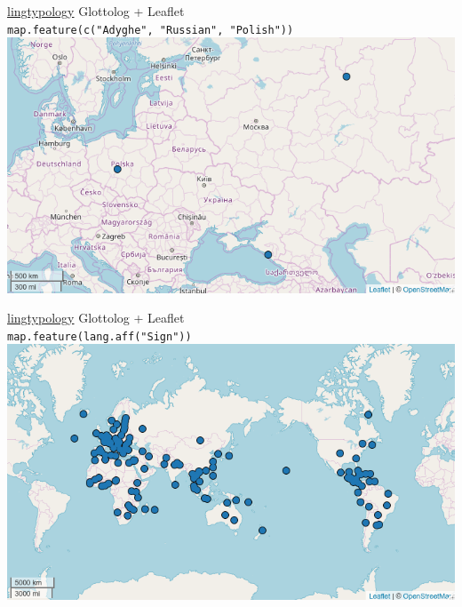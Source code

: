 \documentclass[13pt, t]{beamer}
\begin{document}
\begin{frame}{\href{https://ropensci.github.io/lingtypology/}{lingtypology}}
\alert{\large Glottolog + Leaflet}\\
\vfill
\texttt{\small map.feature(c("Adyghe"{}, "Russian"{}, "Polish"))}\\
\includegraphics[width=\linewidth]{images/01-map}
\end{frame}

\begin{frame}{\href{https://ropensci.github.io/lingtypology/}{lingtypology}}
\alert{\large Glottolog + Leaflet}\\
\vfill
\texttt{\small map.feature(lang.aff("Sign"))}\\
\includegraphics[width=\linewidth]{images/02-sign}
\end{frame}
\end{document}
